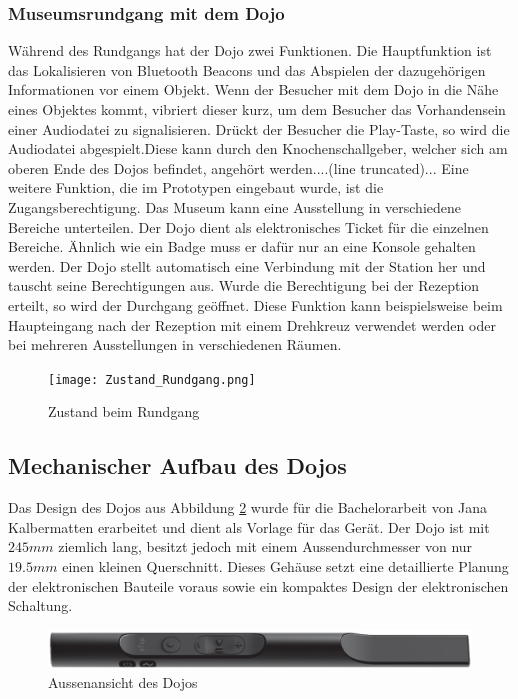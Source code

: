 \subsubsection{Museumsrundgang mit dem Dojo}
Während des Rundgangs hat der Dojo zwei Funktionen. Die Hauptfunktion ist das Lokalisieren von Bluetooth Beacons und das Abspielen der dazugehörigen Informationen vor einem Objekt. Wenn der Besucher mit dem Dojo in die Nähe eines Objektes kommt, vibriert dieser kurz, um dem Besucher das Vorhandensein einer Audiodatei zu signalisieren. Drückt der Besucher die Play-Taste, so wird die Audiodatei abgespielt.Diese kann durch den Knochenschallgeber, welcher sich am oberen Ende des Dojos befindet, angehört werden....(line truncated)...
Eine weitere Funktion, die im Prototypen eingebaut wurde, ist die Zugangsberechtigung. Das Museum kann eine Ausstellung in verschiedene Bereiche unterteilen. Der Dojo dient als elektronisches Ticket für die einzelnen Bereiche. Ähnlich wie ein Badge muss er dafür nur an eine Konsole gehalten werden. Der Dojo stellt automatisch eine Verbindung mit der Station her und tauscht seine Berechtigungen aus. Wurde die Berechtigung bei der Rezeption erteilt, so wird der Durchgang geöffnet. Diese Funktion kann beispielsweise beim Haupteingang nach der Rezeption mit einem Drehkreuz verwendet werden oder bei mehreren Ausstellungen in verschiedenen Räumen.
\begin{figure}[htb]
\texttt{[image: Zustand\_Rundgang.png]}
\caption{Zustand beim Rundgang} %
\label{fig:image4}
\end{figure}











\clearpage
\subsection{Mechanischer Aufbau des Dojos}
Das Design des Dojos aus Abbildung \ref{fig:DojoBild} wurde für die Bachelorarbeit von Jana Kalbermatten erarbeitet und dient als Vorlage für das Gerät. Der Dojo ist mit $245mm$ ziemlich lang, besitzt jedoch mit einem Aussendurchmesser von nur $19.5mm$ einen kleinen Querschnitt. Dieses Gehäuse setzt eine detaillierte Planung der elektronischen Bauteile voraus sowie ein kompaktes Design der elektronischen Schaltung.



\begin{figure}[h]
	\centering
	\includegraphics[width=\textwidth]{graphics/DojoBild.png}
	\caption{Aussenansicht des Dojos}
	\label{fig:DojoBild}
\end{figure}

